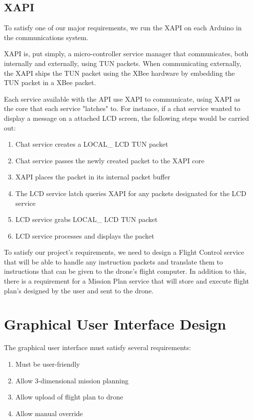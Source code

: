 \documentclass[12pt,a4paper]{article}
\begin{document}
	\subsection{XAPI}
	To satisfy one of our major requirements, we run the XAPI on each Arduino in the communications system. 
	
	XAPI is, put simply, a micro-controller service manager that communicates, both internally and externally, using TUN packets. When communicating externally, the XAPI ships the TUN packet using the XBee hardware by embedding the TUN packet in a XBee packet.
	
	Each service available with the API use XAPI to communicate, using XAPI as the core that each service "latches" to. For instance, if a chat service wanted to display a message on a attached LCD screen, the following steps would be carried out:
	\begin{enumerate}
		\item Chat service creates a LOCAL\_ LCD TUN packet
		\item Chat service passes the newly created packet to the XAPI core
		\item XAPI places the packet in its internal packet buffer
		\item The LCD service latch queries XAPI for any packets designated for the LCD service
		\item LCD service grabs LOCAL\_ LCD TUN packet
		\item LCD service processes and displays the packet
	\end{enumerate}
	
To satisfy our project's requirements, we need to design a Flight Control service that will be able to handle any instruction packets and translate them to instructions that can be given to the drone's flight computer. In addition to this, there is a requirement for a Mission Plan service that will store and execute flight plan's designed by the user and sent to the drone.
	
\section{Graphical User Interface Design}
The graphical user interface must satisfy several requirements:
\begin{enumerate}
	\item Must be user-friendly
	\item Allow 3-dimensional mission planning
	\item Allow upload of flight plan to drone
	\item Allow manual override
\end{enumerate}
\end{document}

